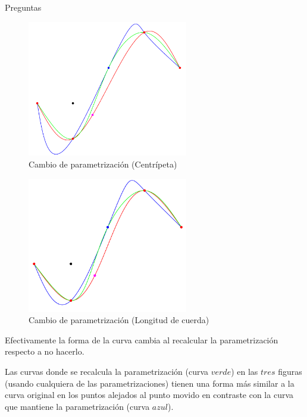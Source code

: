 \begin{section}{Preguntas}
\begin{itemize}
	\VSP
	
	\begin{figure}[H]
		  \centering
			\includegraphics[width=7cm]{graficos/paramVSreparamCentripetal.pdf}
		  \caption{Cambio de parametrización (Centrípeta)}
		  \label{fig:paramChangeCentripetal}
	\end{figure}
	
	\VSP
	
	\begin{figure}[H]
		  \centering
			\includegraphics[width=7cm]{graficos/paramVSreparamChord.pdf}
		  \caption{Cambio de parametrización (Longitud de cuerda)}
		  \label{fig:paramChangeCHLength}
	\end{figure}
	
	\VSP
	
	Efectivamente la forma de la curva cambia al recalcular la parametrización respecto a no hacerlo. 
	
	Las curvas donde se recalcula la parametrización (curva $verde$) en las $tres$ figuras (usando cualquiera de las parametrizaciones) tienen una forma más similar a la curva original en los puntos alejados 
	al punto movido en contraste con la curva que mantiene la parametrización (curva $azul$). 


\end{itemize}
\end{section}
